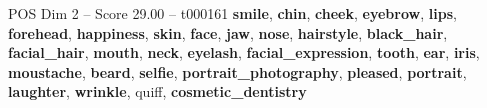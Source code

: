 \begin{textsample}{POS Dim 2 – Score 29.00 – t000161}  \label{ex:f2_pos_005}
\textbf{smile}, \textbf{chin}, \textbf{cheek}, \textbf{eyebrow}, \textbf{lips}, \textbf{forehead}, \textbf{happiness}, \textbf{skin}, \textbf{face}, \textbf{jaw}, \textbf{nose}, \textbf{hairstyle}, \textbf{black\_hair}, \textbf{facial\_hair}, \textbf{mouth}, \textbf{neck}, \textbf{eyelash}, \textbf{facial\_expression}, \textbf{tooth}, \textbf{ear}, \textbf{iris}, \textbf{moustache}, \textbf{beard}, \textbf{selfie}, \textbf{portrait\_photography}, \textbf{pleased}, \textbf{portrait}, \textbf{laughter}, \textbf{wrinkle}, quiff, \textbf{cosmetic\_dentistry}

\end{textsample}

